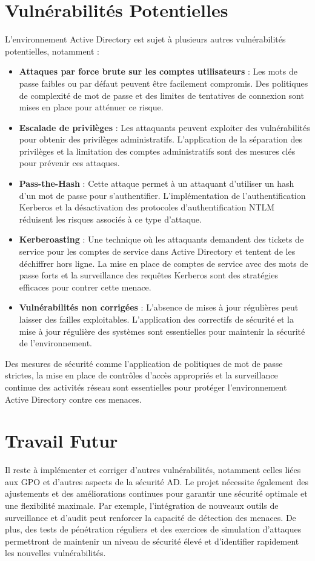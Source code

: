 \documentclass{article}
\begin{document}
\section{Vulnérabilités Potentielles}
L'environnement Active Directory est sujet à plusieurs autres vulnérabilités potentielles, notamment :
\begin{itemize}
    \item \textbf{Attaques par force brute sur les comptes utilisateurs} : Les mots de passe faibles ou par défaut peuvent être facilement compromis. Des politiques de complexité de mot de passe et des limites de tentatives de connexion sont mises en place pour atténuer ce risque.
    \item \textbf{Escalade de privilèges} : Les attaquants peuvent exploiter des vulnérabilités pour obtenir des privilèges administratifs. L'application de la séparation des privilèges et la limitation des comptes administratifs sont des mesures clés pour prévenir ces attaques.
    \item \textbf{Pass-the-Hash} : Cette attaque permet à un attaquant d'utiliser un hash d'un mot de passe pour s'authentifier. L'implémentation de l'authentification Kerberos et la désactivation des protocoles d'authentification NTLM réduisent les risques associés à ce type d'attaque.
    \item \textbf{Kerberoasting} : Une technique où les attaquants demandent des tickets de service pour les comptes de service dans Active Directory et tentent de les déchiffrer hors ligne. La mise en place de comptes de service avec des mots de passe forts et la surveillance des requêtes Kerberos sont des stratégies efficaces pour contrer cette menace.
    \item \textbf{Vulnérabilités non corrigées} : L'absence de mises à jour régulières peut laisser des failles exploitables. L'application des correctifs de sécurité et la mise à jour régulière des systèmes sont essentielles pour maintenir la sécurité de l'environnement.
\end{itemize}

Des mesures de sécurité comme l'application de politiques de mot de passe strictes, la mise en place de contrôles d'accès appropriés et la surveillance continue des activités réseau sont essentielles pour protéger l'environnement Active Directory contre ces menaces.

\section*{Travail Futur}
Il reste à implémenter et corriger d'autres vulnérabilités, notamment celles liées aux GPO et d'autres aspects de la sécurité AD. Le projet nécessite également des ajustements et des améliorations continues pour garantir une sécurité optimale et une flexibilité maximale. Par exemple, l'intégration de nouveaux outils de surveillance et d'audit peut renforcer la capacité de détection des menaces. De plus, des tests de pénétration réguliers et des exercices de simulation d'attaques permettront de maintenir un niveau de sécurité élevé et d'identifier rapidement les nouvelles vulnérabilités.
\end{document}
